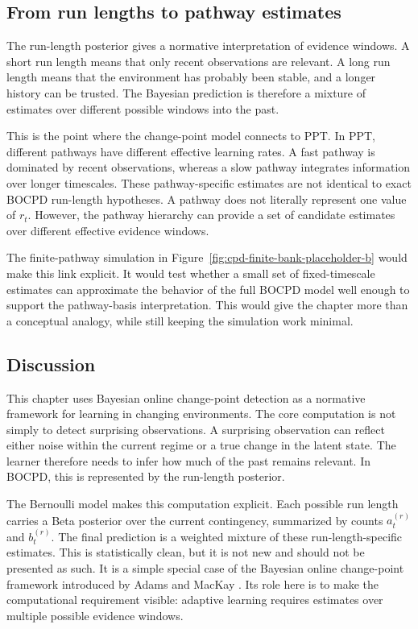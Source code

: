 \subsection{From run lengths to pathway estimates}
\label{sec:cpd-b-pathways}

The run-length posterior gives a normative interpretation of evidence windows. A short run length means that only recent observations are relevant. A long run length means that the environment has probably been stable, and a longer history can be trusted. The Bayesian prediction is therefore a mixture of estimates over different possible windows into the past.

This is the point where the change-point model connects to PPT. In PPT, different pathways have different effective learning rates. A fast pathway is dominated by recent observations, whereas a slow pathway integrates information over longer timescales. These pathway-specific estimates are not identical to exact BOCPD run-length hypotheses. A pathway does not literally represent one value of \(r_t\). However, the pathway hierarchy can provide a set of candidate estimates over different effective evidence windows.

The finite-pathway simulation in Figure~\ref{fig:cpd-finite-bank-placeholder-b} would make this link explicit. It would test whether a small set of fixed-timescale estimates can approximate the behavior of the full BOCPD model well enough to support the pathway-basis interpretation. This would give the chapter more than a conceptual analogy, while still keeping the simulation work minimal.

\subsection{Discussion}
\label{sec:cpd-b-discussion}

This chapter uses Bayesian online change-point detection as a normative framework for learning in changing environments. The core computation is not simply to detect surprising observations. A surprising observation can reflect either noise within the current regime or a true change in the latent state. The learner therefore needs to infer how much of the past remains relevant. In BOCPD, this is represented by the run-length posterior.

The Bernoulli model makes this computation explicit. Each possible run length carries a Beta posterior over the current contingency, summarized by counts \(a_t^{(r)}\) and \(b_t^{(r)}\). The final prediction is a weighted mixture of these run-length-specific estimates. This is statistically clean, but it is not new and should not be presented as such. It is a simple special case of the Bayesian online change-point framework introduced by Adams and MacKay \citep{Adams2007}. Its role here is to make the computational requirement visible: adaptive learning requires estimates over multiple possible evidence windows.

